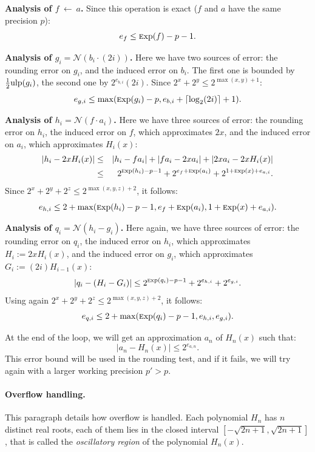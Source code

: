 \documentclass[12pt]{amsart}
\def\ulp{{\rm ulp}}
\def\Exp{{\rm \textsc exp}}
\def\N{{\mathcal N}}
\begin{document}
\par\noindent
\textbf{Analysis of $f~\gets~a$.} Since this operation is exact ($f$ and $a$ have
the same precision $p$):
\[ e_f \le \Exp(f) - p - 1. \]

\par\noindent
\textbf{Analysis of $g_i = \N{}(b_i \cdot{}(2i))$.}
Here we have two sources of error: the rounding error on $g_i$, and
the induced error on $b_i$. The first one is bounded by
$\frac{1}{2} \ulp(g_i)$, the second one by $2^{e_{b,i}} (2i)$.
Since $2^x+2^y \le 2^{\max(x,y)+1}$:
\[ e_{g,i} \le \max(\Exp(g_i)-p, e_{b,i} + \lceil \log_2(2i) \rceil + 1). \]

\par\noindent
\textbf{Analysis of $h_i = \N{}(f\cdot{}a_i)$.}
Here we have three sources of error: the rounding error on $h_i$,
the induced error on $f$, which approximates $2x$,
and the induced error on $a_i$, which approximates $H_i(x)$:
\begin{eqnarray*}
  |h_i - 2x H_i(x)| & \le &
  |h_i - f a_i| + |f a_i - 2x a_i| + |2x a_i - 2x H_i(x)| \\
  & \le & 2^{\Exp(h_i)-p-1} + 2^{e_{f} + \Exp(a_i)} + 2^{1 + \Exp(x) + e_{a,i}}.
\end{eqnarray*}
Since $2^x + 2^y + 2^z \le 2^{\max(x,y,z)+2}$, it follows:
\[ e_{h,i} \le 2 + \max(\Exp(h_i)-p-1, e_{f} + \Exp(a_i),
  1 + \Exp(x) + e_{a,i}). \]

\par\noindent
\textbf{Analysis of $q_i = \N{}(h_i - g_i)$.}
Here again, we have three sources of error: the rounding error on $q_i$,
the induced error on $h_i$, which approximates $H_i := 2x H_i(x)$,
and the induced error on $g_i$, which approximates $G_i := (2i)H_{i-1}(x)$:
\[ |q_i - (H_i - G_i)| \le 2^{\Exp(q_i)-p-1} + 2^{e_{h,i}} + 2^{e_{g,i}}. \]
Using again $2^x + 2^y + 2^z \le 2^{\max(x,y,z)+2}$, it follows:
\[ e_{q,i} \le 2 + \max(\Exp(q_i)-p-1, e_{h,i}, e_{g,i}). \]

At the end of the loop, we will get an approximation $a_n$ of $H_n(x)$ such
that:
\[ |a_n - H_n(x)| \le 2^{e_{a,n}}. \]
This error bound will be used in the rounding test, and if it fails, we will try
again with a larger working precision $p' > p$.

\paragraph{\textbf{Overflow handling.}}

This paragraph details how overflow is handled.
Each polynomial $H_n$ has $n$ distinct real roots, each of them lies in the
closed interval $[-\sqrt{2n+1}, \sqrt{2n+1}]$, that is called the
\emph{oscillatory region} of the polynomial $H_n(x)$.
\end{document}
